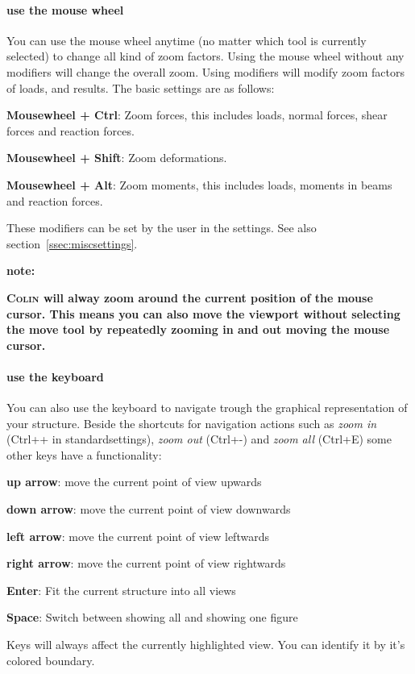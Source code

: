 \documentclass[a4paper,11pt]{report}
\newcommand{\Colin}[0]{\textsc{Colin }}
\begin{document}
\paragraph{use the mouse wheel} You can use the mouse wheel anytime (no matter which tool is currently selected) to change all kind of zoom factors. Using the mouse wheel without any modifiers will change the overall zoom. Using modifiers will modify zoom factors of loads, and results. The basic settings are as follows:
\begin{trivlist}
	\item[]\textbf{Mousewheel + Ctrl}: Zoom forces, this includes loads, normal forces, shear forces and reaction forces.
	\item[]\textbf{Mousewheel + Shift}: Zoom deformations.
	\item[]\textbf{Mousewheel + Alt}: Zoom moments, this includes loads, moments in beams and reaction forces.
\end{trivlist}
These modifiers can be set by the user in the settings. See also section~\ref{ssec:miscsettings}.

\textbf{note:}
\begin{center}
\textbf{\Colin will alway zoom around the current position of the mouse cursor. This means you can also move the viewport without selecting the move tool by repeatedly zooming in and out moving the mouse cursor.}
\end{center}

\paragraph{use the keyboard}
You can also use the keyboard to navigate trough the graphical representation of your structure. Beside the shortcuts for navigation actions such as \textit{zoom in} (Ctrl++ in standardsettings), \textit{zoom out} (Ctrl+-) and \textit{zoom all} (Ctrl+E) some other keys have a functionality:
\begin{trivlist}
	\leftskip=1cm
	\item[]\textbf{up arrow}: move the current point of view upwards
	\item[]\textbf{down arrow}: move the current point of view downwards
	\item[]\textbf{left arrow}: move the current point of view leftwards
	\item[]\textbf{right arrow}: move the current point of view rightwards
	\item[]\textbf{Enter}: Fit the current structure into all views
	\item[]\textbf{Space}: Switch between showing all and showing one figure
\end{trivlist}
Keys will always affect the currently highlighted view. You can identify it by it's colored boundary.
\end{document}

